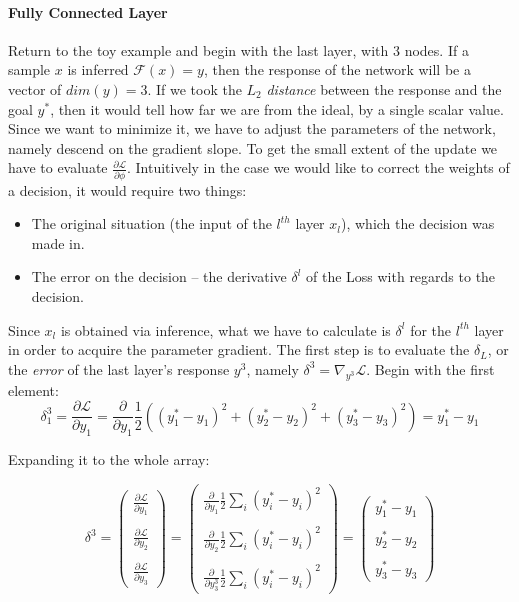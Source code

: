 \paragraph{Fully Connected Layer}
Return to the toy example and begin with the last layer, with $3$ nodes. If a sample $x$ is inferred $\mathcal{F}(x)=y$, then the response of the network will be a vector of $dim(y) = 3$. If we took the $L_2$ \emph{distance} between the response and the goal $y^*$, then it would tell how far we are from the ideal, by a single scalar value. Since we want to minimize it, we have to adjust the parameters of the network, namely descend on the gradient slope. To get the small extent of the update we have to evaluate $\frac{\partial\mathcal{L}}{\partial \phi}$. 
Intuitively in the case we would like to correct the weights of a decision, it would require two things:
\begin{itemize}
    \item[] The original situation (the input of the $l^{th}$ layer $x_l$), which the decision was made in.
    \item[] The error on the decision -- the derivative $\delta^l$ of the Loss with regards to the decision.
\end{itemize}
Since $x_l$ is obtained via inference, what we have to calculate is $\delta^l$ for the $l^{th}$ layer in order to acquire the parameter gradient.
The first step is to evaluate the $\delta_L$, or the \emph{error} of the last layer's response $y^3$, namely $\delta^3 = \nabla_{y^3} \mathcal{L}$.
Begin with the first element: 
$$
    \delta_1^3 = 
    \frac{\partial \mathcal{L}}{\partial y_1} = 
    \frac{\partial}{\partial y_1}\frac{1}{2}\left((y^*_1 - y_1)^2 + (y^*_2 - y_2)^2 + (y^*_3 - y_3)^2\right) = y^*_1 - y_1
$$
\begin{center}
Expanding it to the whole array:
\end{center}
$$
    \delta^3 = \begin{pmatrix}
     \frac{\partial \mathcal{L}}{\partial y_1}\\ \\
    \frac{\partial \mathcal{L}}{\partial y_2} \\ \\
    \frac{\partial \mathcal{L}}{\partial y_3}
    \end{pmatrix} = \begin{pmatrix}
     \frac{\partial}{\partial y_1} \frac{1}{2}\sum_i(y_i^*-y_i)^2\\ \\
    \frac{\partial}{\partial y_2} \frac{1}{2}\sum_i(y_i^*-y_i)^2 \\ \\
    \frac{\partial}{\partial y^3_3}  \frac{1}{2}\sum_i(y_i^*-y_i)^2
    \end{pmatrix} = \begin{pmatrix}
     {y^*_1-y_1}\\ \\
     {y^*_2-y_2}\\ \\
     {y^*_3-y_3}
    \end{pmatrix} 
$$
